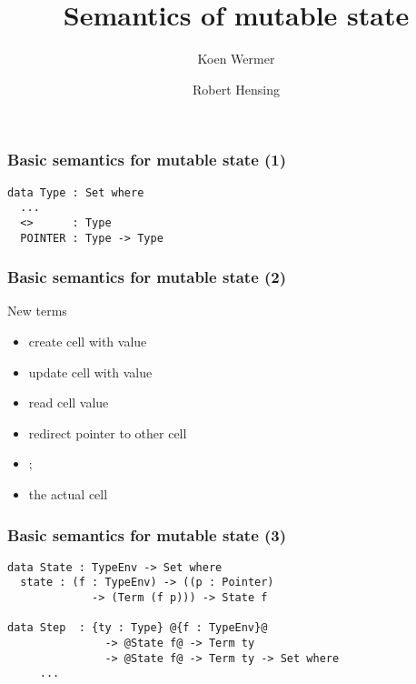 \documentclass{beamer}
\begin{document}
\title{Semantics of mutable state}
\author{Koen Wermer \and Robert Hensing}
\frame{\titlepage}

\begin{frame}[fragile]
\frametitle{Basic semantics for mutable state (1)}

\begin{lstlisting}
data Type : Set where
  ...
  <>      : Type
  POINTER : Type -> Type
\end{lstlisting}

\end{frame}

\begin{frame}
\frametitle{Basic semantics for mutable state (2)}

New terms

\begin{itemize}
  \item create cell with value
  \item update cell with value
  \item read cell value
  \item redirect pointer to other cell
  \item ;
  \item the actual cell
\end{itemize}
\end{frame}

\begin{frame}[fragile]
\frametitle{Basic semantics for mutable state (3)}
\begin{lstlisting}
data State : TypeEnv -> Set where
  state : (f : TypeEnv) -> ((p : Pointer)
             -> (Term (f p))) -> State f

data Step  : {ty : Type} @{f : TypeEnv}@
               -> @State f@ -> Term ty
               -> @State f@ -> Term ty -> Set where
     ...
\end{lstlisting}

\end{frame}
\end{document}
